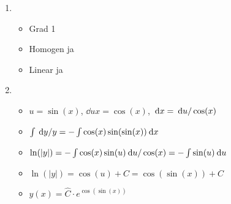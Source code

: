 \item
	\begin{enumerate}
		
	\item
		\begin{itemize}
			\item Grad 1
			\item Homogen ja
			\item Linear ja
		\end{itemize}
	
	\item
		\begin{itemize}
			\item $u=\sin(x)$, $\dd{u}{x} = \cos(x)$, $\:\mathrm{d}{x} = \:\mathrm{d}{u} / \cos(x)$
			\item $\int \:\mathrm{d}{y} / y = - \int \cos(x) \sin(\sin(x)) \:\mathrm{d}{x}$
			\item $\ln(|y|) = - \int \cos(x) \sin(u) \:\mathrm{d}{u} / \cos(x) = - \int \sin(u) \:\mathrm{d}{u}$
			\item $\ln(|y|) = \cos(u) + C = \cos(\sin(x)) + C$
			\item $y(x) = \hat{C} \cdot e^{\cos(\sin(x))}$
		\end{itemize}
			
	\end{enumerate}
